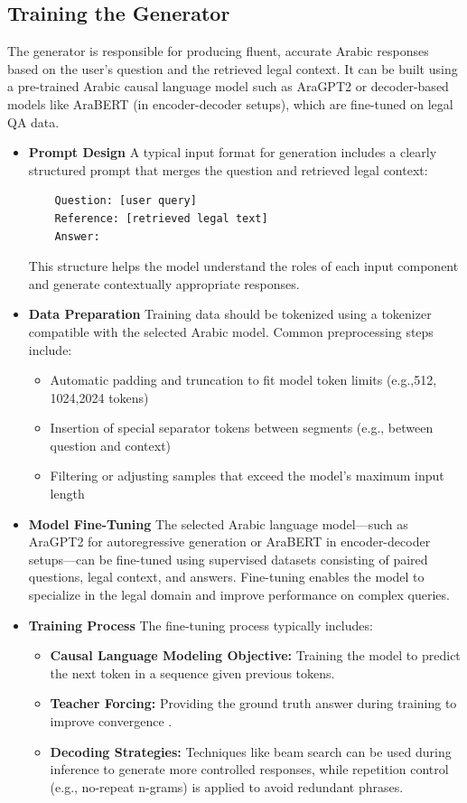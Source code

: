 \subsection{Training the Generator}
The generator is responsible for producing fluent, accurate Arabic responses based on the user’s question and the retrieved legal context. It can be built using a pre-trained Arabic causal language model such as AraGPT2 or decoder-based models like AraBERT (in encoder-decoder setups), which are fine-tuned on legal QA data.
\begin{itemize}

\item\textbf{Prompt Design}
A typical input format for generation includes a clearly structured prompt that merges the question and retrieved legal context:
\begin{verbatim}
	Question: [user query]
	Reference: [retrieved legal text]
	Answer:
\end{verbatim}
This structure helps the model understand the roles of each input component and generate contextually appropriate responses.

\item\textbf{Data Preparation}
Training data should be tokenized using a tokenizer compatible with the selected Arabic model. Common preprocessing steps include:
\begin{itemize}
	\item Automatic padding and truncation to fit model token limits (e.g.,512, 1024,2024 tokens)
	\item Insertion of special separator tokens between segments (e.g., between question and context)
	\item Filtering or adjusting samples that exceed the model’s maximum input length
\end{itemize}
\item\textbf{Model Fine-Tuning}
The selected Arabic language model—such as AraGPT2 for autoregressive generation or AraBERT in encoder-decoder setups—can be fine-tuned using supervised datasets consisting of paired questions, legal context, and answers. Fine-tuning enables the model to specialize in the legal domain and improve performance on complex queries.
\item\textbf{Training Process}
The fine-tuning process typically includes:
\begin{itemize}
	\item \textbf{Causal Language Modeling Objective:} Training the model to predict the next token in a sequence given previous tokens.
	\item \textbf{Teacher Forcing:} Providing the ground truth answer during training to improve convergence .
	\item \textbf{Decoding Strategies:} Techniques like beam search can be used during inference to generate more controlled responses, while repetition control (e.g., no-repeat n-grams) is applied to avoid redundant phrases.
\end{itemize}


\end{itemize}
